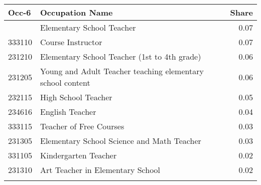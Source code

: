 \begin{tabularx}{\textwidth}{llr}
\toprule
{Occ-6}&{Occupation Name}&{Share} \tabularnewline
\midrule\addlinespace[1.5ex]
331205&Elementary School Teacher &0.07 \tabularnewline
333110&Course Instructor&0.07 \tabularnewline
231210&Elementary School Teacher (1st to 4th grade)&0.06 \tabularnewline
231205&Young and Adult Teacher teaching elementary school content \hspace{.3cm} &0.06 \tabularnewline
232115&High School Teacher&0.05 \tabularnewline
234616&English Teacher&0.04 \tabularnewline
333115&Teacher of Free Courses&0.03 \tabularnewline
231305&Elementary School Science and Math Teacher&0.03 \tabularnewline
331105&Kindergarten Teacher &0.02 \tabularnewline
231310&Art Teacher in Elementary School&0.02 \tabularnewline
\bottomrule \addlinespace[1.5ex]
\end{tabularx}

